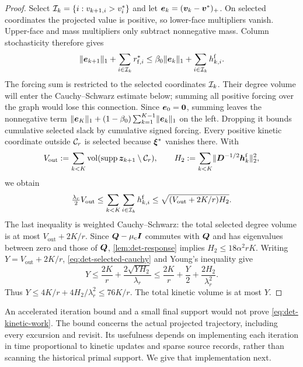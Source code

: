 \begin{proof}
Select $\mathcal{I}_k=\{i:v_{k+1,i}>v_i^*\}$ and let
$\bm{e}_k=(\bm{v}_k-\bm{v}^*)_+$. On selected coordinates the projected value is
positive, so lower-face multipliers vanish. Upper-face and mass multipliers
only subtract nonnegative mass. Column stochasticity therefore gives
\begin{equation}
 \lVert\bm{e}_{k+1}\rVert_1+\sum_{i\in \mathcal{I}_k}r_{{\mathrm{f}},i}^*
 \leq\beta_0\lVert\bm{e}_k\rVert_1+\sum_{i\in \mathcal{I}_k}h_{k,i}^{\mathrm{f}}.
 \label{eq:det-selected-flow}
\end{equation}
The forcing sum is restricted to the selected coordinates $\mathcal{I}_k$.
Their degree volume will enter the Cauchy--Schwarz estimate below;
summing all positive forcing over the graph would lose this connection.
Since $\bm{e}_0=\bm{0}$, summing leaves the nonnegative term
$\lVert\bm{e}_K\rVert_1+(1-\beta_0)\sum_{k=1}^{K-1}\lVert\bm{e}_k\rVert_1$ on the left.
Dropping it bounds cumulative selected slack by cumulative signed forcing.
Every positive kinetic coordinate outside $\mathcal{C}_r$ is selected because
$\bm{\xi}^*$ vanishes there. With
\[
 V_{\mathrm{out}}:=\sum_{k<K}\operatorname{vol}(\operatorname{supp}\bm{z}_{k+1}\setminus\mathcal{C}_r),
 \qquad H_2:=\sum_{k<K}\lVert\bm{D}^{-1/2}\bm{h}_k^{\mathrm{f}}\rVert_2^2,
\]
we obtain
\begin{equation}
 \tfrac{\lambda_r}2 V_{\mathrm{out}}
 \leq\sum_{k<K}\sum_{i\in \mathcal{I}_k}h_{k,i}^{\mathrm{f}}
 \leq\sqrt{(V_{\mathrm{out}}+2K/r)H_2}.
 \label{eq:det-selected-cauchy}
\end{equation}
The last inequality is weighted Cauchy--Schwarz: the total selected
degree volume is at most $V_{\mathrm{out}}+2K/r$.
Since $\bm{Q}-\mu_{\mathrm{c}}\bm{I}$ commutes with $\bm{Q}$ and has eigenvalues
between zero and those of $\bm{Q}$, \cref{lem:det-response} implies
$H_2\leq18\alpha^2rK$.
Writing $Y=V_{\mathrm{out}}+2K/r$, \cref{eq:det-selected-cauchy} and
Young's inequality give
\[
 Y\leq\frac{2K}{r}+\frac{2\sqrt{YH_2}}{\lambda_r}
 \leq\frac{2K}{r}+\frac Y2+\frac{2H_2}{\lambda_r^2}.
\]
Thus $Y\leq4K/r+4H_2/\lambda_r^2\leq76K/r$.
The total kinetic volume is at most $Y$.
\end{proof}

An accelerated iteration bound and a small final support would not prove
\cref{eq:det-kinetic-work}. The bound concerns the actual projected
trajectory, including every excursion and revisit. Its usefulness depends
on implementing each iteration in time proportional to kinetic updates
and sparse source records, rather than scanning the historical primal
support. We give that implementation next.
